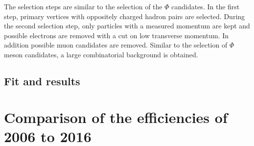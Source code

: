 The selection steps are similar to the selection of the $\Phi$ candidates. In the first step, primary vertices with oppositely charged hadron pairs are selected. During the second selection step, only particles with a measured momentum are kept and possible electrons are removed with a cut on low transverse momentum. In addition possible muon candidates are removed. Similar to the selection of $\Phi$ meson candidates, a large combinatorial background is obtained.

\subsection{Fit and results}


\section{Comparison of the efficiencies of 2006 to 2016}
